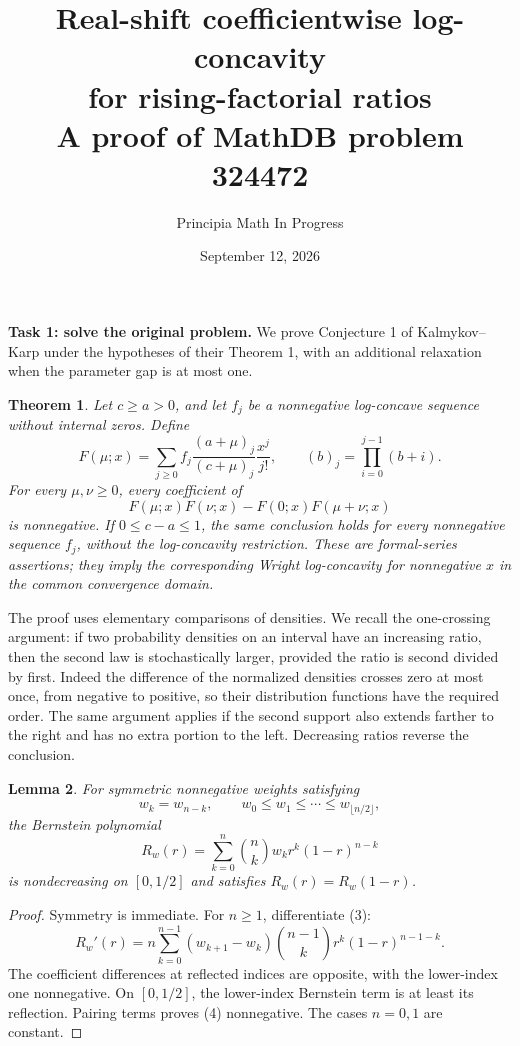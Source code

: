 \documentclass[10pt]{article}
\title{Real-shift coefficientwise log-concavity\\for rising-factorial ratios\\
\large A proof of MathDB problem 324472}
\author{Principia Math In Progress}
\date{September 12, 2026}
\newtheorem{theorem}{Theorem}
\newtheorem{lemma}[theorem]{Lemma}
\begin{document}
\maketitle

\noindent\textbf{Task 1: solve the original problem.}
We prove Conjecture 1 of Kalmykov--Karp \cite[p.~408]{KK} under the
hypotheses of their Theorem 1, with an additional relaxation when the
parameter gap is at most one.

\begin{theorem}\label{main}
Let \(c\ge a>0\), and let \(f_j\) be a nonnegative log-concave sequence
without internal zeros. Define
\[
 F(\mu;x)=\sum_{j\ge0}f_j\frac{(a+\mu)_j}{(c+\mu)_j}\frac{x^j}{j!},
 \qquad (b)_j=\prod_{i=0}^{j-1}(b+i).
\]
For every \(\mu,\nu\ge0\), every coefficient of
\[
 F(\mu;x)F(\nu;x)-F(0;x)F(\mu+\nu;x)                 \tag{1}
\]
is nonnegative. If \(0\le c-a\le1\), the same conclusion holds for every
nonnegative sequence \(f_j\), without the log-concavity restriction.
These are formal-series assertions; they imply the corresponding
Wright log-concavity for nonnegative \(x\) in the common convergence domain.
\end{theorem}

The proof uses elementary comparisons of densities. We recall the
one-crossing argument: if two probability densities on an interval have
an increasing ratio, then the second law is stochastically larger,
provided the ratio is second divided by first. Indeed the difference of
the normalized densities crosses zero at most once, from negative to
positive, so their distribution functions have the required order.
The same argument applies if the second support also extends farther
to the right and has no extra portion to the left. Decreasing ratios
reverse the conclusion.

\begin{lemma}\label{poly}
For symmetric nonnegative weights satisfying
\[
 w_k=w_{n-k},\qquad
 w_0\le w_1\le\cdots\le w_{\lfloor n/2\rfloor},      \tag{2}
\]
the Bernstein polynomial
\[
 R_w(r)=\sum_{k=0}^n\binom nk w_k r^k(1-r)^{n-k}
 \tag{3}
\]
is nondecreasing on \([0,1/2]\) and satisfies \(R_w(r)=R_w(1-r)\).
\end{lemma}
\begin{proof}
Symmetry is immediate. For \(n\ge1\), differentiate (3):
\[
 R_w'(r)=n\sum_{k=0}^{n-1}(w_{k+1}-w_k)
                  \binom{n-1}k r^k(1-r)^{n-1-k}.
 \tag{4}
\]
The coefficient differences at reflected indices are opposite, with the
lower-index one nonnegative. On \([0,1/2]\), the lower-index Bernstein
term is at least its reflection. Pairing terms proves (4) nonnegative.
The cases \(n=0,1\) are constant.
\end{proof}
\end{document}
